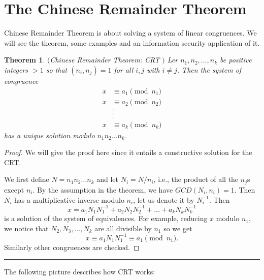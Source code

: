 \documentclass[12pt]{article}
\theoremstyle{plain}
\newtheorem{theorem}{Theorem}
\theoremstyle{definition}
\theoremstyle{remark}
\begin{document}
\section{The Chinese Remainder Theorem}
Chinese Remainder Theorem is about solving a system of linear congruences. We will see the theorem, some examples and an information security application of it.
\begin{theorem} $($Chinese Remainder Theorem: CRT $)$ \label{CRT} Ler $n_1, n_2, \dots, n_k$ be positive integers $>1$ so that $(n_i,n_j)=1$ for all $i, j$ with $i\neq j$. Then the system of congruence
\begin{align*}
    x &\equiv a_1 \pmod{n_1} \\
    x &\equiv a_2 \pmod{n_2} \\
    &.\\
    &.\\
    &.\\
    x &\equiv a_k \pmod{n_k}
\end{align*}
has a unique solution modulo $n_1n_2\dots n_k$.
\end{theorem}
\begin{proof}
We will give the proof here since it entails a constructive solution for the CRT.

We first define $N=n_1n_2\dots n_k$ and let $N_i=N/n_i$, i.e., the product of all the $n_j$s except $n_i$. By the assumption in the theorem, we have $GCD(N_i, n_i)=1$. Then $N_i$ has a multiplicative inverse modulo $n_i$, let us denote it by $N_i^{-1}$. Then
$$x=a_1N_1N_1^{-1}+a_2N_2N_2^{-1}+\dots +a_kN_kN_k^{-1}$$
is a solution of the system of equivalences. For example, reducing $x$ modulo $n_1$, we notice that $N_2, N_3, \dots, N_k$ are all divisible by $n_1$ so we get
$$x\equiv a_1N_1N_1^{-1} \equiv a_1 \pmod{n_1}. $$ Similarly other congruences are checked.
\end{proof}
\hrule
\medskip

The following picture describes how CRT works:

\bigskip
\end{document}
